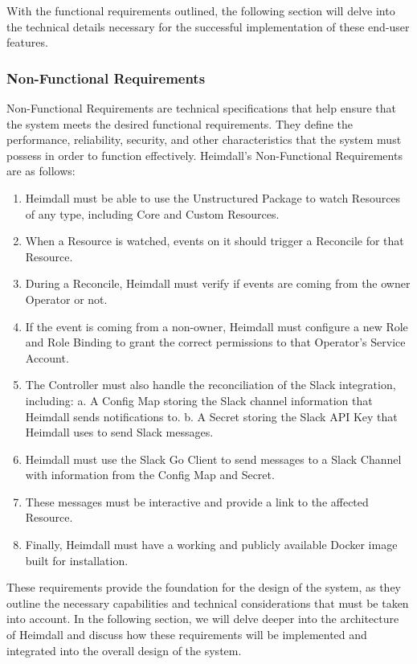 \documentclass{article}
\begin{document}
With the functional requirements outlined, the following section will delve into the technical details necessary for the successful implementation of these end-user features.

\subsubsection{Non-Functional Requirements}

Non-Functional Requirements are technical specifications that help ensure that the system meets the desired functional requirements. They define the performance, reliability, security, and other characteristics that the system must possess in order to function effectively. Heimdall's Non-Functional Requirements are as follows:
\begin{enumerate}
    \itemsep0em
    \item Heimdall must be able to use the Unstructured Package to watch Resources of any type, including Core and Custom Resources.
    \item When a Resource is watched, events on it should trigger a Reconcile for that Resource.
    \item During a Reconcile, Heimdall must verify if events are coming from the owner Operator or not.
    \item If the event is coming from a non-owner, Heimdall must configure a new Role and Role Binding to grant the correct permissions to that Operator's Service Account.
    \item The Controller must also handle the reconciliation of the Slack integration, including:
    \subitem a. A Config Map storing the Slack channel information that Heimdall sends notifications to.
    \subitem b. A Secret storing the Slack API Key that Heimdall uses to send Slack messages.
    \item Heimdall must use the Slack Go Client to send messages to a Slack Channel with information from the Config Map and Secret.
    \item These messages must be interactive and provide a link to the affected Resource.
    \item Finally, Heimdall must have a working and publicly available Docker image built for installation.
\end{enumerate}

These requirements provide the foundation for the design of the system, as they outline the necessary capabilities and technical considerations that must be taken into account. In the following section, we will delve deeper into the architecture of Heimdall and discuss how these requirements will be implemented and integrated into the overall design of the system.
\end{document}
